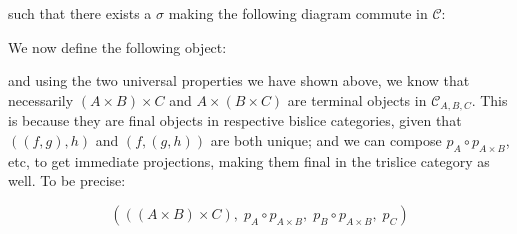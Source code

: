 \documentclass[12pt, letterpaper, twoside]{report}
\begin{document}
such that there exists a $\sigma$ making the following diagram commute in $\mathcal{C}$:


We now define the following object:


and using the two universal properties we have shown above, we know that necessarily $(A \times B) \times C$ and $A \times (B \times C)$ are terminal objects in $\mathcal{C}_{A,B,C}$. This is because they are final objects in respective bislice categories, given that $((f,g),h)$ and $(f,(g,h))$ are both unique; and we can compose $p_A \circ p_{A \times B}$, etc, to get immediate projections, making them final in the trislice category as well. To be precise:

$$(((A \times B) \times C), \; p_A \circ p_{A \times B}, \; p_B \circ p_{A \times B}, \; p_C)$$
\end{document}
